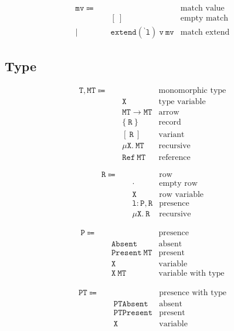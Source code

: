 \documentclass{report}
\newcommand{\code}{\mathtt}
\newcommand{\backtick}{{}^{\backprime}}
\begin{document}
\begin{align*}
\code{mv} \Coloneqq \quad & & \text{match value} \\
& \code{[\ ]} & \text{empty match} \\
| \quad & \code{extend(\backtick l)\ v\ mv} & \text{match extend}
\end{align*}

\subsection{Type}

\begin{align*}
\code{T, MT} \Coloneqq \quad & & \text{monomorphic type} \\
& \code{X} & \text{type variable} \\
& \code{MT \rightarrow MT} & \text{arrow} \\
& \code{\{\ R\ \}} & \text{record} \\
& \code{[\ R\ ]} & \text{variant} \\
& \code{\mu X.\ MT} & \text{recursive} \\
& \code{Ref\ MT} & \text{reference}
\end{align*}

\begin{align*}
\code{R} \Coloneqq \quad & & \text{row} \\
& \code{\cdot} & \text{empty row} \\
& \code{X} & \text{row variable} \\
& \code{l : P, R} & \text{presence} \\
& \code{\mu X.\ R} & \text{recursive}
\end{align*}

\begin{align*}
\code{P} \Coloneqq \quad & & \text{presence} \\
& \code{Absent} & \text{absent} \\
& \code{Present\ MT} & \text{present} \\
& \code{X} & \text{variable} \\
& \code{X\ MT} & \text{variable with type}
\end{align*}

\begin{align*}
\code{PT} \Coloneqq \quad & & \text{presence with type} \\
& \code{PTAbsent} & \text{absent} \\
& \code{PTPresent} & \text{present} \\
& \code{X} & \text{variable}
\end{align*}
\end{document}
